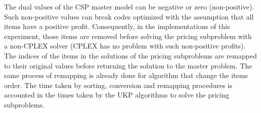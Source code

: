 The dual values of the CSP master model can be negative or zero (non-positive).
Such non-positive values can break codes optimized with the assumption that all items have a positive profit.
Consequently, in the implementations of this experiment, those items are removed before solving the pricing subproblem with a non-CPLEX solver (CPLEX has no problem with such non-positive profits).
The indices of the items in the solutions of the pricing subproblems are remapped to their original values before returning the solution to the master problem.
The same process of remapping is already done for algorithm that change the items order.
The time taken by sorting, conversion and remapping procedures is accounted in the times taken by the UKP algorithms to solve the pricing subproblems.

